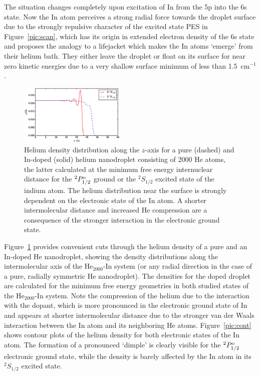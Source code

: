 \documentclass[twoside,twocolumn,9pt]{article}
\begin{document}
The situation changes completely upon excitation of In from the 5p into the 6s state. Now the In atom perceives a strong radial force towards the droplet surface due to the strongly repulsive character of the excited state PES in Figure~\ref{pic:scan}, which has its origin in extended electron density of the 6s state and proposes the analogy to a lifejacket which makes the In atoms `emerge' from their helium bath. They either leave the droplet or float on its surface for near zero kinetic energies due to a very shallow surface minimum of less than 1.5~cm$^{-1}$.

\begin{figure}[htbp]
  	\begin{center}
 		\includegraphics[width=0.45\textwidth]{4.eps}
                \caption{Helium density distribution along the $z$-axis for a pure (dashed) and In-doped (solid) helium nanodroplet consisting of 2000 He atoms, the latter calculated at the minimum free energy internuclear distance for the $^2P^{\rm o}_{1/2}$ ground or the $^2S_{1/2}$ excited state of the indium atom. The helium distribution near the surface is strongly dependent on the electronic state of the In atom. A shorter intermolecular distance and increased He compression are a consequence of the stronger interaction in the electronic ground state.\label{pic:cut}}
  	\end{center}
\end{figure}

Figure~\ref{pic:cut} provides convenient cuts through the helium density of a pure and an In-doped He nanodroplet, showing the density distributions along the intermolecular axis of the He$_{2000}$-In system (or any radial direction in the case of a pure,  radially symmetric He nanodroplet). The densities for the doped droplet are calculated for the minimum free energy geometries in both studied states of the He$_{2000}$-In system. Note the compression of the helium due to the interaction with the dopant, which is more pronounced in the electronic ground state of In and appears at shorter intermolecular distance due to the stronger van der Waals interaction between the In atom and its neighboring He atoms. Figure~\ref{pic:cont} shows contour plots of the helium density for both electronic states of the In atom. The formation of a pronounced `dimple' is clearly visible for the $^2P^{\rm o}_{1/2}$ electronic ground state, while the density is barely affected by the In atom in its $^2S_{1/2}$ excited state. 
\end{document}
